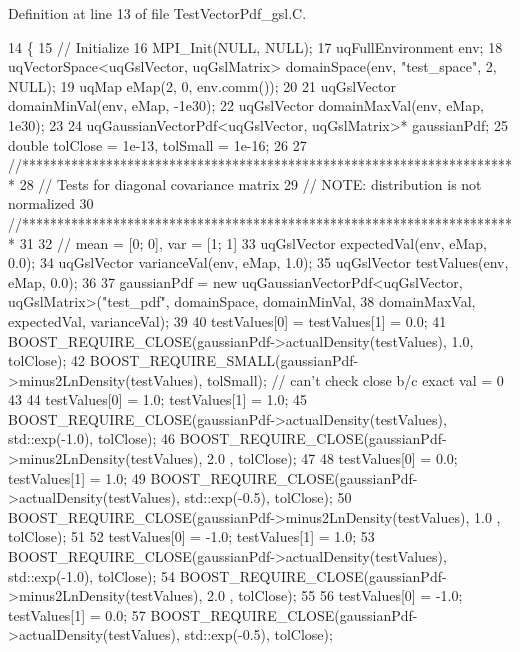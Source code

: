Definition at line 13 of file Test\-Vector\-Pdf\-\_\-gsl.\-C.


\begin{DoxyCode}
14 \{
15   \textcolor{comment}{// Initialize}
16   MPI\_Init(NULL, NULL);
17   uqFullEnvironment env;
18   uqVectorSpace<uqGslVector, uqGslMatrix> domainSpace(env, \textcolor{stringliteral}{"test\_space"}, 2, NULL);
19   uqMap eMap(2, 0, env.comm());
20 
21   uqGslVector domainMinVal(env, eMap, -1e30);
22   uqGslVector domainMaxVal(env, eMap,  1e30);
23 
24   uqGaussianVectorPdf<uqGslVector, uqGslMatrix>* gaussianPdf;
25   \textcolor{keywordtype}{double} tolClose = 1e-13, tolSmall = 1e-16;
26   
27   \textcolor{comment}{//***********************************************************************}
28   \textcolor{comment}{// Tests for diagonal covariance matrix}
29   \textcolor{comment}{// NOTE: distribution is not normalized}
30   \textcolor{comment}{//***********************************************************************}
31 
32   \textcolor{comment}{// mean = [0; 0], var = [1; 1]}
33   uqGslVector expectedVal(env, eMap, 0.0);
34   uqGslVector varianceVal(env, eMap, 1.0);
35   uqGslVector testValues(env, eMap, 0.0);
36 
37   gaussianPdf = \textcolor{keyword}{new} uqGaussianVectorPdf<uqGslVector, uqGslMatrix>(\textcolor{stringliteral}{"test\_pdf"}, domainSpace, domainMinVal, 
38                                                                                  domainMaxVal, expectedVal,
       varianceVal);
39 
40   testValues[0] = testValues[1] = 0.0;
41   BOOST\_REQUIRE\_CLOSE(gaussianPdf->actualDensity(testValues), 1.0, tolClose);
42   BOOST\_REQUIRE\_SMALL(gaussianPdf->minus2LnDensity(testValues),    tolSmall); \textcolor{comment}{// can't check close b/c
       exact val = 0}
43 
44   testValues[0] = 1.0; testValues[1] = 1.0;
45   BOOST\_REQUIRE\_CLOSE(gaussianPdf->actualDensity(testValues), std::exp(-1.0), tolClose);
46   BOOST\_REQUIRE\_CLOSE(gaussianPdf->minus2LnDensity(testValues),         2.0 , tolClose);
47 
48   testValues[0] = 0.0; testValues[1] = 1.0;
49   BOOST\_REQUIRE\_CLOSE(gaussianPdf->actualDensity(testValues), std::exp(-0.5), tolClose);
50   BOOST\_REQUIRE\_CLOSE(gaussianPdf->minus2LnDensity(testValues),         1.0 , tolClose);
51 
52   testValues[0] = -1.0; testValues[1] = 1.0;
53   BOOST\_REQUIRE\_CLOSE(gaussianPdf->actualDensity(testValues), std::exp(-1.0), tolClose);
54   BOOST\_REQUIRE\_CLOSE(gaussianPdf->minus2LnDensity(testValues),         2.0 , tolClose);
55 
56   testValues[0] = -1.0; testValues[1] = 0.0;
57   BOOST\_REQUIRE\_CLOSE(gaussianPdf->actualDensity(testValues), std::exp(-0.5), tolClose);

\end{DoxyCode}
